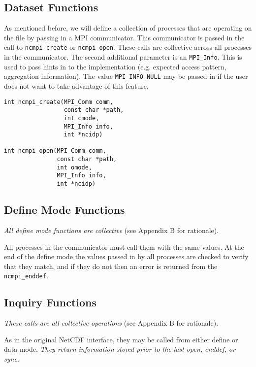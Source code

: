 \documentclass[10pt]{article}
\begin{document}
\subsection{Dataset Functions}

As mentioned before, we will define a collection of processes that are
operating on the file by passing in a MPI communicator.  This communicator is
passed in the call to \texttt{ncmpi\_create} or \texttt{ncmpi\_open}.  These
calls are collective across all processes in the communicator.  The second
additional parameter is an \texttt{MPI\_Info}.  This is used to pass hints in
to the implementation (e.g. expected access pattern, aggregation
information).  The value \texttt{MPI\_INFO\_NULL} may be passed in if the user
does not want to take advantage of this feature.

\begin{verbatim}
int ncmpi_create(MPI_Comm comm,
                 const char *path,
                 int cmode,
                 MPI_Info info,
                 int *ncidp)

int ncmpi_open(MPI_Comm comm,
               const char *path,
               int omode,
               MPI_Info info,
               int *ncidp)
\end{verbatim}

\subsection{Define Mode Functions}

\emph{All define mode functions are collective} (see Appendix B for
rationale).

All processes in the communicator must call them with the same values.  At the
end of the define mode the values passed in by all processes are checked to
verify that they match, and if they do not then an error is returned from the
\texttt{ncmpi\_enddef}.


\subsection{Inquiry Functions}

\emph{These calls are all collective operations} (see Appendix B for
rationale).

As in the original NetCDF interface, they may be called from either define or
data mode.  \emph{ They return information stored prior to the last open,
enddef, or sync.}

%
\end{document}
